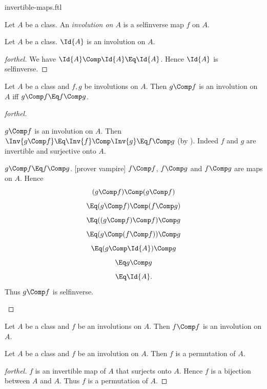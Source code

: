 \documentclass{stex}
\begin{document}
\begin{smodule}{invertible-maps.ftl}
\begin{definition*}[forthel,for=involution]
  Let $A$ be a class.
  An \emph{involution on $A$} is a selfinverse map $f$ on $A$.
\end{definition*}

\begin{proposition*}[forthel]
  Let $A$ be a class.
  $\Id{A}$ is an involution on $A$.
\end{proposition*}
\begin{proof}[forthel]
  We have $\Id{A} \Comp \Id{A} \Eq \Id{A}$.
  Hence $\Id{A}$ is selfinverse.
\end{proof}

\begin{proposition*}[forthel]
  Let $A$ be a class and $f, g$ be involutions on $A$.
  Then $g \Comp f$ is an involution on $A$ iff $g \Comp f \Eq f \Comp g$.
\end{proposition*}
\begin{proof}[forthel]
  \begin{case}{$g \Comp f$ is an involution on $A$.}
    Then $\Inv{g \Comp f}
      \Eq \Inv{f} \Comp \Inv{g}
      \Eq f \Comp g$
    (by ).
    Indeed $f$ and $g$ are invertible and surjective onto $A$.
  \end{case}

  \begin{case}{$g \Comp f \Eq f \Comp g$.}
    [prover vampire]
    $f \Comp f$, $f \Comp g$ and $f \Comp g$ are maps on $A$.
    Hence
    \[  (g \Comp f) \Comp (g \Comp f)       \]
    \[    \Eq (g \Comp f) \Comp (f \Comp g)   \]
    \[    \Eq ((g \Comp f) \Comp f) \Comp g   \]
    \[    \Eq (g \Comp (f \Comp f)) \Comp g   \]
    \[    \Eq (g \Comp \Id{A}) \Comp g       \]
    \[    \Eq g \Comp g                       \]
    \[    \Eq \Id{A}.                        \]
    Thus $g \Comp f$ is selfinverse.
  \end{case}
\end{proof}

\begin{proposition*}[forthel]
  Let $A$ be a class and $f$ be an involutions on $A$.
  Then $f \Comp f$ is an involution on $A$.
\end{proposition*}

\begin{proposition*}[forthel]
  Let $A$ be a class and $f$ be an involution on $A$.
  Then $f$ is a permutation of $A$.
\end{proposition*}
\begin{proof}[forthel]
  $f$ is an invertible map of $A$ that surjects onto $A$.
  Hence $f$ is a bijection between $A$ and $A$.
  Thus $f$ is a permutation of $A$.
\end{proof}

\end{smodule}
\end{document}
